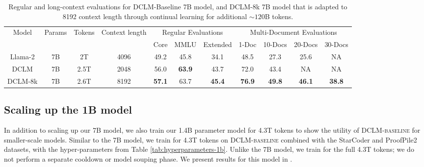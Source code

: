 \documentclass{article}
\newcommand{\hqpool}{\textsc{DCLM-baseline}\xspace}
\begin{document}
\begin{table}[t]
    \centering
    \caption{Regular and long-context evaluations for DCLM-Baseline 7B model, and DCLM-8k 7B model that is adapted to 8192 context length through continual learning for additional $\sim 120$B tokens.}
    \resizebox{0.99\textwidth}{!}
    {
    \begin{tabular}{cccc|ccc|cccc}
    \toprule
    \multirow{2}{*}{Model} & \multirow{2}{*}{Params} & \multirow{2}{*}{Tokens} & \multirow{2}{1.2cm}{\centering Context length}  & \multicolumn{3}{c|}{Regular Evaluations} & \multicolumn{4}{c}{Multi-Document Evaluations}\\
    &&&&Core&MMLU&Extended& 1-Doc& 10-Docs& 20-Docs & 30-Docs\\
    \midrule
    Llama-2 & 7B & 2T & 4096 & 49.2 & 45.8 & 34.1 & 48.5 & 27.3 & 25.6 & NA\\
    \midrule
    DCLM & 7B & 2.5T & 2048 & 56.0 &{\bf 63.9} &43.7 & 72.0 & 43.4 & NA & NA\\
    DCLM-8k & 7B & 2.6T & 8192 & {\bf 57.1} &63.7 &{\bf 45.4} & {\bf 76.9} & {\bf 49.8} & {\bf 46.1} &{\bf 38.8}\\
    \bottomrule
    \end{tabular}
    \label{table:8k-context}
    }
\end{table}

\subsection{Scaling up the 1B model}
\label{sec:scaling-1b-model}
In addition to scaling up our 7B model, we also train our 1.4B parameter model for 4.3T tokens to show the utility of \hqpool{} for smaller-scale models.
Similar to the 7B model, we train for 4.3T tokens on \hqpool{} combined with the StarCoder and ProofPile2 datasets, with the hyper-parameters from Table \ref{tab:hyperparameters-1b}. Unlike the 7B model, we train for the full 4.3T tokens; we do not perform a separate cooldown or model souping phase.
We present results for this model in .
\end{document}
